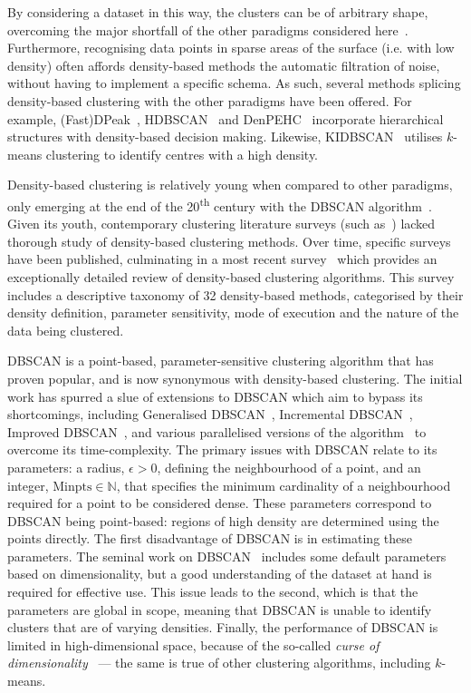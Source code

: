 By considering a dataset in this way, the clusters can be of arbitrary shape,
overcoming the major shortfall of the other paradigms considered
here~\cite{Raykov2016}. Furthermore, recognising data points in sparse areas of
the surface (i.e. with low density) often affords density-based methods the
automatic filtration of noise, without having to implement a specific schema. As
such, several methods splicing density-based clustering with the other paradigms
have been offered. For example, (Fast)DPeak~\cite{Chen2020},
HDBSCAN~\cite{Campello2013} and DenPEHC~\cite{Xu2016} incorporate hierarchical
structures with density-based decision making. Likewise,
KIDBSCAN~\cite{Tsai2006} utilises \(k\)-means clustering to identify centres
with a high density.

Density-based clustering is relatively young when compared to other paradigms,
only emerging at the end of the 20\textsuperscript{th} century with the DBSCAN
algorithm~\cite{Ester1996}. Given its youth, contemporary clustering literature
surveys (such as~\cite{Jain1999,Xu2005}) lacked thorough study of density-based
clustering methods. Over time, specific surveys have been published, culminating
in a most recent survey~\cite{Bhattacharjee2020} which provides an exceptionally
detailed review of density-based clustering algorithms. This survey includes a
descriptive taxonomy of 32 density-based methods, categorised by their density
definition, parameter sensitivity, mode of execution and the nature of the data
being clustered.

DBSCAN is a point-based, parameter-sensitive clustering algorithm that has
proven popular, and is now synonymous with density-based clustering. The initial
work has spurred a slue of extensions to DBSCAN which aim to bypass its
shortcomings, including Generalised DBSCAN~\cite{Sander1998}, Incremental
DBSCAN~\cite{Bakr2015,Ester1998}, Improved DBSCAN~\cite{Borah2004}, and various
parallelised versions of the algorithm~\cite{Bohm2009,He2011,Loh2014,Xu2002} to
overcome its time-complexity. The primary issues with DBSCAN relate to its
parameters: a radius, \(\epsilon > 0\), defining the neighbourhood of a point,
and an integer, \(\text{Minpts} \in \mathbb N\), that specifies the minimum
cardinality of a neighbourhood required for a point to be considered dense.
These parameters correspond to DBSCAN being point-based: regions of high density
are determined using the points directly. The first disadvantage of DBSCAN is in
estimating these parameters. The seminal work on DBSCAN~\cite{Ester1996}
includes some default parameters based on dimensionality, but a good
understanding of the dataset at hand is required for effective use. This issue
leads to the second, which is that the parameters are global in scope, meaning
that DBSCAN is unable to identify clusters that are of varying densities.
Finally, the performance of DBSCAN is limited in high-dimensional space, because
of the so-called \emph{curse of dimensionality}~\cite{Keogh2017} --- the same is
true of other clustering algorithms, including \(k\)-means.

